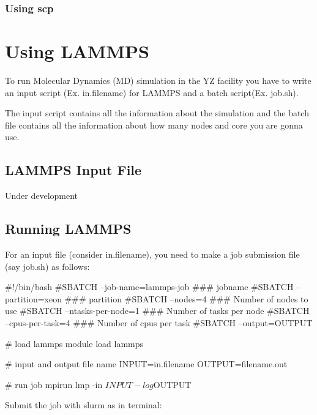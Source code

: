 \documentclass{book}
\begin{document}
\subsection{Using scp}%
\label{sub:using_scp}





\chapter{Using LAMMPS}%
\label{cha:using_lammps}

To run Molecular Dynamics (MD) simulation in the YZ facility you have to write an input script (Ex. in.filename) for LAMMPS and a batch script(Ex. job.sh).

The input script contains all the information about the simulation and the batch file contains all the information about how many nodes and core you are gonna use.

\section{LAMMPS Input File}%
\label{sec:lammps_input_file}

Under development

\section{Running LAMMPS}%
\label{sec:running_lammps}

For an input file (consider in.filename), you need to make a job submission file (say job.sh) as follows:

\begin{myverbatim}
	#!/bin/bash
	#SBATCH --job-name=lammps-job 	### jobname
	#SBATCH --partition=xeon	### partition
	#SBATCH --nodes=4 		### Number of nodes to use
	#SBATCH --ntasks-per-node=1 	### Number of tasks per node
	#SBATCH --cpus-per-task=4 	### Number of cpus per task
	#SBATCH --output=OUTPUT%

	# load lammps
	module load lammps

	# input and output file name
	INPUT=in.filename
	OUTPUT=filename.out

	# run job
	mpirun lmp -in ${INPUT} -log ${OUTPUT}

\end{myverbatim}

Submit the job with slurm as in terminal:
\end{document}
